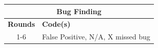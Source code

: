 \centering
\small
\begin{tabular}{|cp{10cm}|}
\hline
\multicolumn{2}{|c|}{\textbf{Bug Finding}}                                \\ \hline
\multicolumn{1}{|l|}{\textbf{Rounds}} & \textbf{Code(s)}                  \\ \hline
\multicolumn{1}{|c|}{1-6}             & False Positive, N/A, X missed bug \\ \hline
\end{tabular}